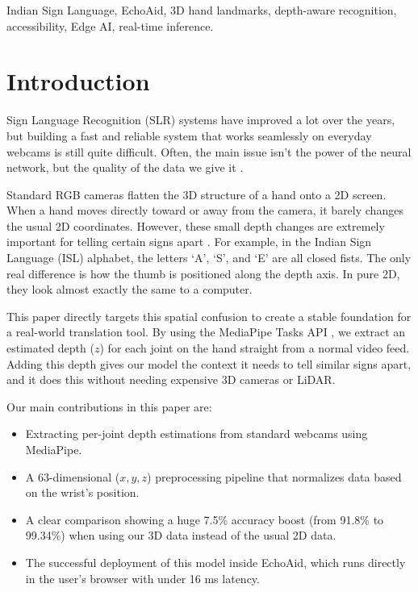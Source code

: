 \documentclass[conference]{IEEEtran}
\begin{document}
\begin{IEEEkeywords}
Indian Sign Language, EchoAid, 3D hand landmarks, depth-aware recognition, accessibility, Edge AI, real-time inference.
\end{IEEEkeywords}

\section{\textbf{Introduction}}
Sign Language Recognition (SLR) systems have improved a lot over the years, but building a fast and reliable system that works seamlessly on everyday webcams is still quite difficult. Often, the main issue isn't the power of the neural network, but the quality of the data we give it \cite{wadhawan2021}.

Standard RGB cameras flatten the 3D structure of a hand onto a 2D screen. When a hand moves directly toward or away from the camera, it barely changes the usual 2D coordinates. However, these small depth changes are extremely important for telling certain signs apart \cite{bragg2019}. For example, in the Indian Sign Language (ISL) alphabet, the letters `A', `S', and `E' are all closed fists. The only real difference is how the thumb is positioned along the depth axis. In pure 2D, they look almost exactly the same to a computer.

This paper directly targets this spatial confusion to create a stable foundation for a real-world translation tool. By using the MediaPipe Tasks API \cite{lugaresi2019}, we extract an estimated depth ($z$) for each joint on the hand straight from a normal video feed. Adding this depth gives our model the context it needs to tell similar signs apart, and it does this without needing expensive 3D cameras or LiDAR.

Our main contributions in this paper are:
\begin{itemize}
    \item Extracting per-joint depth estimations from standard webcams using MediaPipe.
    \item A 63-dimensional ($x, y, z$) preprocessing pipeline that normalizes data based on the wrist's position.
    \item A clear comparison showing a huge 7.5\% accuracy boost (from 91.8\% to 99.34\%) when using our 3D data instead of the usual 2D data.
    \item The successful deployment of this model inside EchoAid, which runs directly in the user's browser with under 16 ms latency.
\end{itemize}
\end{document}
